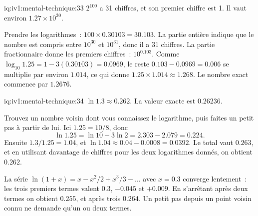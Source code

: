 \begin{solution}{iq:iv1:mental-technique:33}
$2^{100}$ a 31 chiffres, et son premier chiffre est 1. Il vaut environ $1.27 \times 10^{30}$.

Prendre les logarithmes~: $100 \times 0.30103 = 30.103$. La partie entière indique que le nombre est compris entre $10^{30}$ et $10^{31}$, donc il a 31 chiffres. La partie fractionnaire donne les premiers chiffres~: $10^{0.103}$. Comme $\log_{10} 1.25 = 1 - 3(0.30103) = 0.0969$, le reste $0.103 - 0.0969 = 0.006$ se multiplie par environ $1.014$, ce qui donne $1.25 \times 1.014 \approx 1.268$. Le nombre exact commence par $1.2676$.

\end{solution}

\begin{solution}{iq:iv1:mental-technique:34}
$\ln 1.3 \approx 0.262$. La valeur exacte est $0.26236$.

Trouvez un nombre voisin dont vous connaissez le logarithme, puis faites un petit pas à partir de lui. Ici $1.25 = 10/8$, donc
\[
\ln 1.25 = \ln 10 - 3 \ln 2 = 2.303 - 2.079 = 0.224.
\]
Ensuite $1.3 / 1.25 = 1.04$, et $\ln 1.04 \approx 0.04 - 0.0008 = 0.0392$. Le total vaut $0.263$, et en utilisant davantage de chiffres pour les deux logarithmes donnés, on obtient $0.262$.

La série $\ln(1 + x) = x - x^2/2 + x^3/3 - \dots$ avec $x = 0.3$ converge lentement~: les trois premiers termes valent $0.3$, $-0.045$ et $+0.009$. En s'arrêtant après deux termes on obtient $0.255$, et après trois $0.264$. Un petit pas depuis un point voisin connu ne demande qu'un ou deux termes.

\end{solution}

